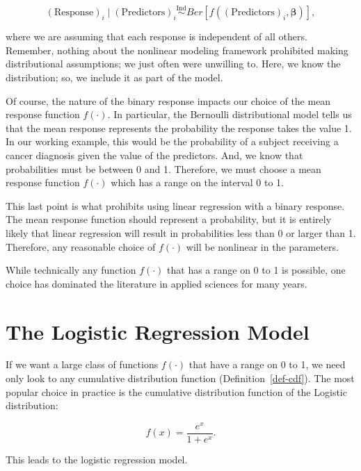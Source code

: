 \documentclass[
  letterpaper,
  DIV=11,
  numbers=noendperiod]{scrreprt}
\theoremstyle{definition}
\theoremstyle{definition}
\theoremstyle{remark}
\begin{document}
\[(\text{Response})_i \mid (\text{Predictors})_i \stackrel{\text{Ind}}{\sim} Ber\left[f\left((\text{Predictors})_i, \boldsymbol{\beta}\right)\right],\]

where we are assuming that each response is independent of all others.
Remember, nothing about the nonlinear modeling framework prohibited
making distributional assumptions; we just often were unwilling to.
Here, we know the distribution; so, we include it as part of the model.

Of course, the nature of the binary response impacts our choice of the
mean response function \(f(\cdot)\). In particular, the Bernoulli
distributional model tells us that the mean response represents the
probability the response takes the value 1. In our working example, this
would be the probability of a subject receiving a cancer diagnosis given
the value of the predictors. And, we know that probabilities must be
between 0 and 1. Therefore, we must choose a mean response function
\(f(\cdot)\) which has a range on the interval 0 to 1.

This last point is what prohibits using linear regression with a binary
response. The mean response function should represent a probability, but
it is entirely likely that linear regression will result in
probabilities less than 0 or larger than 1. Therefore, any reasonable
choice of \(f(\cdot)\) will be nonlinear in the parameters.

While technically any function \(f(\cdot)\) that has a range on 0 to 1
is possible, one choice has dominated the literature in applied sciences
for many years.

\hypertarget{the-logistic-regression-model}{%
\section{The Logistic Regression
Model}\label{the-logistic-regression-model}}

If we want a large class of functions \(f(\cdot)\) that have a range on
0 to 1, we need only look to any cumulative distribution function
(Definition~\ref{def-cdf}). The most popular choice in practice is the
cumulative distribution function of the Logistic distribution:

\[f(x) = \frac{e^x}{1 + e^x}.\]

This leads to the logistic regression model.
\end{document}
